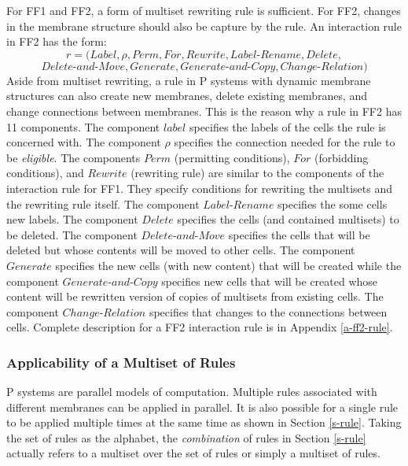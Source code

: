 \documentclass{article}
\newcommand{\mn}{\text{-}}
\begin{document}
For FF1 and FF2, a form of multiset rewriting rule is sufficient. For FF2, changes in the membrane 
structure should also be capture by the rule. An interaction rule in FF2 has the form: 
$$r=(Label, \rho, Perm, For, Rewrite, Label\mn Rename, Delete, $$ $$Delete\mn and\mn Move,Generate, 
Generate\mn and \mn Copy, Change\mn Relation)$$ 
Aside from multiset rewriting, a rule in P systems with dynamic membrane structures can also create
new membranes, delete existing membranes, and change connections between membranes. This is the
reason why a rule in FF2 has 11 components. The component $label$ specifies the labels of the
cells the rule is concerned with. The component $\rho$ specifies the connection needed for the rule
to be \emph{eligible}. The components $Perm$ (permitting conditions), $For$ (forbidding conditions),
and $Rewrite$ (rewriting rule) are similar to the components of the interaction rule for FF1. They 
specify conditions for rewriting the multisets and the rewriting rule itself. The component 
$Label\mn Rename$ specifies the some cells new labels. The component $Delete$ specifies the cells 
(and contained multisets) to be deleted. The component $Delete\mn and\mn Move$  specifies the cells
that will be deleted but whose contents will be moved to other cells. The component $Generate$ 
specifies the new cells (with new content) that will be created while the component $Generate\mn and
\mn Copy$ specifies new cells that will be created whose content will be rewritten version of copies
of multisets from existing cells. The component $Change\mn Relation$ specifies that changes to the 
connections between cells. Complete description for a FF2 interaction rule is in Appendix 
\ref{a-ff2-rule}.


\subsubsection{Applicability of a Multiset of Rules} \label{s-applicable}

P systems are parallel models of computation. Multiple rules associated with different membranes can
be applied in parallel. It is also possible for a single rule to be applied multiple times at the 
same time as shown in Section \ref{s-rule}. Taking the set of rules as the alphabet, the 
\emph{combination} of rules in Section \ref{s-rule} actually refers to a multiset over the set of
rules or simply a multiset of rules. 
\end{document}
